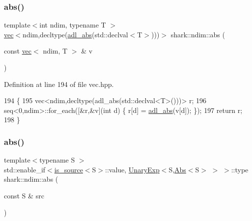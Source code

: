 \subsubsection{\texorpdfstring{abs()}{abs()}\hspace{0.1cm}{\footnotesize\ttfamily [1/2]}}
{\footnotesize\ttfamily template$<$int ndim, typename T $>$ \\
\hyperlink{structshark_1_1ndim_1_1vec}{vec}$<$ndim,decltype(\hyperlink{namespaceshark_a01c919545e5586af9484f058f38774b6}{adl\+\_\+abs}(std\+::declval$<$T$>$)))$>$ shark\+::ndim\+::abs (\begin{DoxyParamCaption}\item[{const \hyperlink{structshark_1_1ndim_1_1vec}{vec}$<$ ndim, T $>$ \&}]{v }\end{DoxyParamCaption})\hspace{0.3cm}{\ttfamily [inline]}}



Definition at line 194 of file vec.\+hpp.


\begin{DoxyCode}
194                                                                                       \{
195             vec<ndim,decltype(adl\_abs(std::declval<T>()))> r;
196             seq<0,ndim>::for\_each([&r,&v](\textcolor{keywordtype}{int} d) \{ r[d] = \hyperlink{namespaceshark_a01c919545e5586af9484f058f38774b6}{adl\_abs}(v[d]); \});
197             \textcolor{keywordflow}{return} r;
198         \}
\end{DoxyCode}
\hypertarget{namespaceshark_1_1ndim_a6ec5334c10df1824526954ad5a205531}{}\label{namespaceshark_1_1ndim_a6ec5334c10df1824526954ad5a205531} 
\subsubsection{\texorpdfstring{abs()}{abs()}\hspace{0.1cm}{\footnotesize\ttfamily [2/2]}}
{\footnotesize\ttfamily template$<$typename S $>$ \\
std\+::enable\+\_\+if$<$\hyperlink{classshark_1_1ndim_1_1is__source}{is\+\_\+source}$<$S$>$\+::value, \hyperlink{classshark_1_1ndim_1_1_unary_exp}{Unary\+Exp}$<$S,\hyperlink{classshark_1_1ndim_1_1_abs}{Abs}$<$S$>$ $>$ $>$\+::type shark\+::ndim\+::abs (\begin{DoxyParamCaption}\item[{const S \&}]{src }\end{DoxyParamCaption})}



